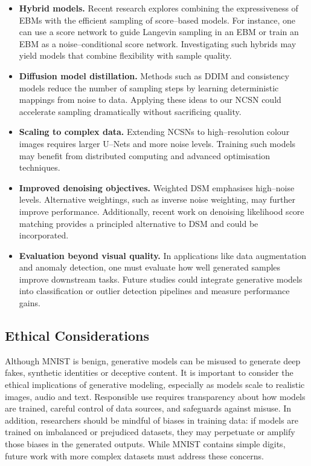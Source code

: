 \begin{itemize}[leftmargin=*]
  \item \textbf{Hybrid models.}  Recent research explores combining the
    expressiveness of EBMs with the efficient sampling of score–based
    models.  For instance, one can use a score network to guide Langevin
    sampling in an EBM or train an EBM as a noise–conditional score
    network.  Investigating such hybrids may yield models that combine
    flexibility with sample quality.
  \item \textbf{Diffusion model distillation.}  Methods such as DDIM and
    consistency models reduce the number of sampling steps by learning
    deterministic mappings from noise to data.  Applying these ideas to
    our NCSN could accelerate sampling dramatically without sacrificing
    quality.
  \item \textbf{Scaling to complex data.}  Extending NCSNs to
    high–resolution colour images requires larger U–Nets and more noise
    levels.  Training such models may benefit from distributed computing
    and advanced optimisation techniques.
  \item \textbf{Improved denoising objectives.}  Weighted DSM emphasises
    high–noise levels.  Alternative weightings, such as inverse noise
    weighting, may further improve performance.  Additionally, recent
    work on denoising likelihood score matching provides a principled
    alternative to DSM and could be incorporated.
  \item \textbf{Evaluation beyond visual quality.}  In applications like
    data augmentation and anomaly detection, one must evaluate how well
    generated samples improve downstream tasks.  Future studies could
    integrate generative models into classification or outlier detection
    pipelines and measure performance gains.
\end{itemize}

\subsection{Ethical Considerations}

Although MNIST is benign, generative models can be misused to generate
deep fakes, synthetic identities or deceptive content.  It is important
to consider the ethical implications of generative modeling, especially
as models scale to realistic images, audio and text.  Responsible use
requires transparency about how models are trained, careful control of
data sources, and safeguards against misuse.  In addition, researchers
should be mindful of biases in training data: if models are trained on
imbalanced or prejudiced datasets, they may perpetuate or amplify those
biases in the generated outputs.  While MNIST contains simple digits,
future work with more complex datasets must address these concerns.


